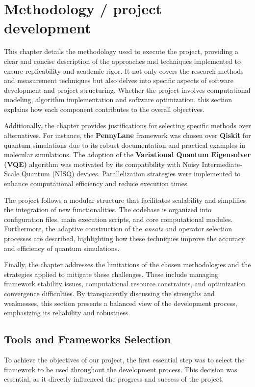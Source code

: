 

\chapter{Methodology / project development}

This chapter details the methodology used to execute the project, providing a clear and concise description of the approaches and techniques implemented to ensure replicability and academic rigor. It not only covers the research methods and measurement techniques but also delves into specific aspects of software development and project structuring. Whether the project involves computational modeling, algorithm implementation and software optimization, this section explains how each component contributes to the overall objectives.

Additionally, the chapter provides justifications for selecting specific methods over alternatives. For instance, the \textbf{PennyLane} framework was chosen over \textbf{Qiskit} for quantum simulations due to its robust documentation and practical examples in molecular simulations. The adoption of the \textbf{Variational Quantum Eigensolver (VQE)} algorithm was motivated by its compatibility with Noisy Intermediate-Scale Quantum (NISQ) devices. Parallelization strategies were implemented to enhance computational efficiency and reduce execution times.

The project follows a modular structure that facilitates scalability and simplifies the integration of new functionalities. The codebase is organized into configuration files, main execution scripts, and core computational modules. Furthermore, the adaptive construction of the \textit{ansatz} and operator selection processes are described, highlighting how these techniques improve the accuracy and efficiency of quantum simulations.

Finally, the chapter addresses the limitations of the chosen methodologies and the strategies applied to mitigate these challenges. These include managing framework stability issues, computational resource constraints, and optimization convergence difficulties. By transparently discussing the strengths and weaknesses, this section presents a balanced view of the development process, emphasizing its reliability and robustness.

\section{Tools and Frameworks Selection}
To achieve the objectives of our project, the first essential step was to select the framework to be used throughout the development process. This decision was essential, as it directly influenced the progress and success of the project.

